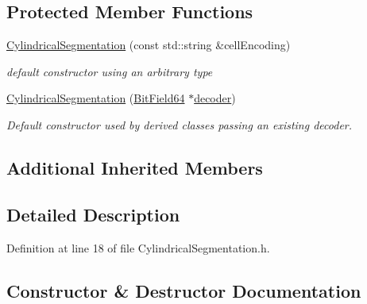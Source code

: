 \subsection*{Protected Member Functions}
\begin{DoxyCompactItemize}
\item 
\hyperlink{class_d_d4hep_1_1_d_d_segmentation_1_1_cylindrical_segmentation_afe34b42dad91d1b2fc50d21ecae094fe}{Cylindrical\+Segmentation} (const std\+::string \&cell\+Encoding)
\begin{DoxyCompactList}\small\item\em default constructor using an arbitrary type \end{DoxyCompactList}\item 
\hyperlink{class_d_d4hep_1_1_d_d_segmentation_1_1_cylindrical_segmentation_ab523036ee9a48b8a7046c99b12cc8401}{Cylindrical\+Segmentation} (\hyperlink{class_d_d4hep_1_1_d_d_segmentation_1_1_bit_field64}{Bit\+Field64} $\ast$\hyperlink{class_d_d4hep_1_1_d_d_segmentation_1_1_segmentation_abec3489982d0fe91ef4b142d9d755576}{decoder})
\begin{DoxyCompactList}\small\item\em Default constructor used by derived classes passing an existing decoder. \end{DoxyCompactList}\end{DoxyCompactItemize}
\subsection*{Additional Inherited Members}


\subsection{Detailed Description}


Definition at line 18 of file Cylindrical\+Segmentation.\+h.



\subsection{Constructor \& Destructor Documentation}
\hypertarget{class_d_d4hep_1_1_d_d_segmentation_1_1_cylindrical_segmentation_a7f069ce1b0c511e208a847ad3e5ddef7}{}\label{class_d_d4hep_1_1_d_d_segmentation_1_1_cylindrical_segmentation_a7f069ce1b0c511e208a847ad3e5ddef7} 
